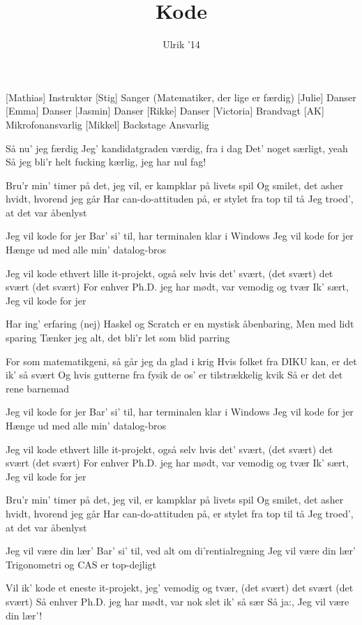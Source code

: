 \documentclass[a4paper,11pt]{article}
\title{Kode}
\author{Ulrik '14}
\begin{document}
\maketitle

\begin{roles}
[Mathias] Instruktør
[Stig] Sanger (Matematiker, der lige er færdig)
[Julie] Danser
[Emma] Danser
[Jasmin] Danser
[Rikke] Danser
[Victoria] Brandvagt
[AK] Mikrofonansvarlig
[Mikkel] Backstage Ansvarlig
\end{roles}

\begin{song}
 Så nu' jeg færdig
Jeg' kandidatgraden værdig, fra i dag
Det' noget særligt, yeah
Så jeg bli'r helt fucking kærlig, jeg har nul fag!

 Bru'r min' timer på det, jeg vil, er kampklar på livets spil
Og smilet, det asher hvidt, hvorend jeg går
Har can-do-attituden på, er stylet fra top til tå
Jeg troed', at det var åbenlyst

 Jeg vil kode for jer
Bar' si' til, har terminalen klar i Windows
Jeg vil kode for jer
Hænge ud med alle min' datalog-bros

 Jeg vil kode ethvert lille it-projekt, også selv hvis det' svært,
(det svært)
det svært (det svært)
For enhver Ph.D. jeg har mødt, var vemodig og tvær
Ik' sært,
Jeg vil kode for jer

 Har ing' erfaring (nej)
Haskel og Scratch er en mystisk åbenbaring,
Men med lidt sparing
Tænker jeg alt, det bli'r let som blid parring

 For som matematikgeni, så går jeg da glad i krig
Hvis folket fra DIKU kan, er det ik' så svært
Og hvis gutterne fra fysik de os' er tilstrækkelig kvik
Så er det det rene barnemad

 Jeg vil kode for jer
Bar' si' til, har terminalen klar i Windows
Jeg vil kode for jer
Hænge ud med alle min' datalog-bros

 Jeg vil kode ethvert lille it-projekt, også selv hvis det' svært,
(det svært)
det svært (det svært)
For enhver Ph.D. jeg har mødt, var vemodig og tvær
Ik' sært,
Jeg vil kode for jer

 Bru'r min' timer på det, jeg vil, er kampklar på livets spil
Og smilet, det asher hvidt, hvorend jeg går
Har can-do-attituden på, er stylet fra top til tå
Jeg troed', at det var åbenlyst

 Jeg vil være din lær'
Bar' si' til, ved alt om di'rentialregning
Jeg vil være din lær'
Trigonometri og CAS er top-dejligt

 Vil ik' kode et eneste it-projekt, jeg' vemodig og tvær,
(det svært)
det svært (det svært)
Så enhver Ph.D. jeg har mødt, var nok slet ik' så sær
Så ja:,
Jeg vil være din lær'!
\end{song}
\end{document}
